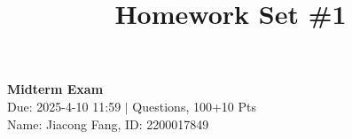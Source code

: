 \documentclass[11pt]{article}
\title{Homework Set \#1}
\begin{document}
    \pagestyle{fancy}
    \chead{}
    \fancyfoot[R]{} 
    \fancyfoot[C]{\thepage\ /\ \pageref{LastPage} \\ \textcolor{lightgray}{Last Compile: \today}}


    \begin{center}
        {\LARGE \bf Midterm Exam}\\
        {Due: 2025-4-10 11:59 \quad$|$ Questions, 100+10 Pts}\\
        {Name: Jiacong Fang, ID: 2200017849}
    \end{center}


    
    \clearpage
    
    \clearpage
    
    \clearpage
    
    \clearpage 
     
    
\end{document}
